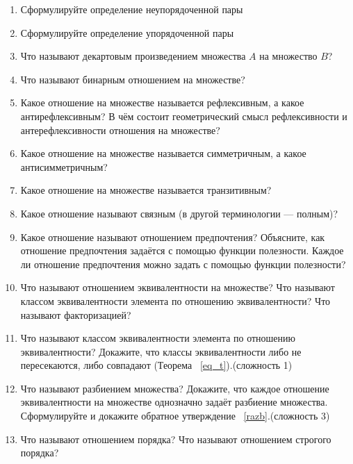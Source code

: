 \documentclass[12pt,oneside]{article}
\theoremstyle{definition}
\begin{document}
\begin{enumerate}
\item Сформулируйте определение неупорядоченной пары

\item Сформулируйте определение упорядоченной пары

\item Что называют декартовым произведением множества $A$ на множество $B$? 

\item Что называют бинарным отношением  на множестве?

\item Какое отношение на множестве называется рефлексивным, а какое антирефлексивным? В чём состоит геометрический смысл рефлексивности и антерефлексивности отношения на множестве?
                                                          
\item Какое отношение на множестве называется симметричным, а какое антисимметричным?

\item Какое отношение на множестве называется транзитивным?

\item Какое отношение называют связным (в другой терминологии --- полным)?

\item Какое отношение называют отношением предпочтения? Объясните, как отношение предпочтения задаётся с помощью функции полезности. Каждое ли отношение предпочтения можно задать с помощью функции полезности?

\item  Что называют отношением эквивалентности на множестве? Что называют классом эквивалентности элемента по отношению эквивалентности? Что называют факторизацией?

\item Что называют классом эквивалентности элемента по отношению эквивалентности?  Докажите, что классы эквивалентности либо не пересекаются, либо совпадают (Теорема ~\ref{eq_t}).(сложность 1)

\item Что называют разбиением множества? Докажите, что каждое отношение эквивалентности на множестве однозначно задаёт разбиение множества. Сформулируйте и докажите обратное утверждение ~\ref{razb}.(сложность 3)

\item  Что называют отношением порядка? Что называют отношением строгого порядка?


\end{enumerate}
\end{document}

